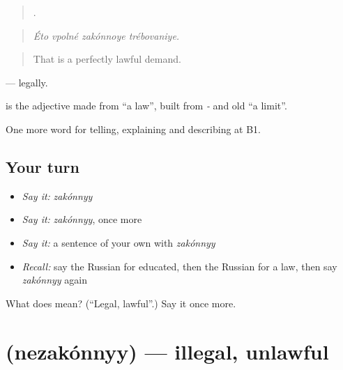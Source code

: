 \begin{quote}
   .
\end{quote}

\begin{quote}
\emph{Éto vpolné zakónnoye trébovaniye.}
\end{quote}

\begin{quote}
That is a perfectly lawful demand.
\end{quote}

\emph{} — legally.

\begin{cousinweb}
\textbf{} is the adjective made from \emph{} \textquotedblleft{}a law\textquotedblright{}, built from \emph{-} and old \emph{} \textquotedblleft{}a limit\textquotedblright{}.
\end{cousinweb}

\begin{grammarlens}[title={What you've built}]
One more word for telling, explaining and describing at B1.
\end{grammarlens}

\subsection*{Your turn}
\begin{itemize}
\raggedright
  \item \emph{Say it:} \emph{zakónnyy}
  \item \emph{Say it:} \emph{zakónnyy}, once more
  \item \emph{Say it:} a sentence of your own with \emph{zakónnyy}
  \item \emph{Recall:} say the Russian for educated, then the Russian for a law, then say \emph{zakónnyy} again
\end{itemize}

\begin{tcolorbox}[breakable,colback=teal!4,colframe=teal!35!black,title={Before you move on}]
What does  mean? (\textquotedblleft{}Legal, lawful\textquotedblright{}.) Say it once more.
\end{tcolorbox}
\section[\texorpdfstring{\ru{незаконный} (nezakónnyy)}{незаконный (nezakónnyy)}]{ (nezakónnyy) — illegal, unlawful}

